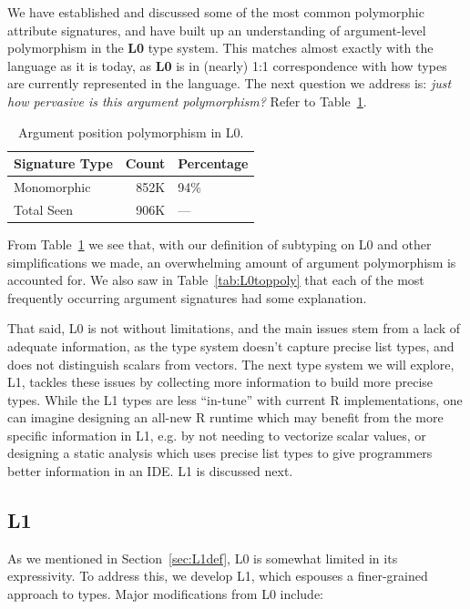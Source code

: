 \documentclass[acmsmall,10pt,review,anonymous]{acmart}\settopmatter{printfolios=true,printccs=false,printacmref=false}
\begin{document}
We have established and discussed some of the most common polymorphic attribute signatures, and have built up an understanding of argument-level polymorphism in the {\bf L0} type system.
This matches almost exactly with the language as it is today, as {\bf L0} is in (nearly) 1:1 correspondence with how types are currently represented in the language.
The next question we address is: {\it just how pervasive is this argument polymorphism?}
Refer to Table~\ref{tab:L0argcounts}.

\begin{table}[ht]\label{tab:L0argcounts}\centering
\begin{tabular}{lrl}
  \hline
Signature Type & Count & Percentage \\ 
  \hline
Monomorphic & 852K & 94\% \\ 
  Total Seen & 906K & --- \\ 
   \hline
\end{tabular}
\caption{Argument position polymorphism in L0.}
\end{table}

From Table~\ref{tab:L0argcounts} we see that, with our definition of subtyping on L0 and other simplifications we made, an overwhelming amount of argument polymorphism is accounted for.
We also saw in Table~\ref{tab:L0toppoly} that each of the most frequently occurring argument signatures had some explanation.

That said, L0 is not without limitations, and the main issues stem from a lack of adequate information, as the type system doesn't capture precise list types, and does not distinguish scalars from vectors.
The next type system we will explore, L1, tackles these issues by collecting more information to build more precise types.
While the L1 types are less ``in-tune'' with current R implementations, one can imagine designing an all-new R runtime which may benefit from the more specific information in L1, e.g. by not needing to vectorize scalar values, or designing a static analysis which uses precise list types to give programmers better information in an IDE.
L1 is discussed next.

%
%
%
%
\subsection{L1}

As we mentioned in Section~\ref{sec:L1def}, L0 is somewhat limited in its expressivity. 
To address this, we develop L1, which espouses a finer-grained approach to types. 
Major modifications from L0 include:
\end{document}
